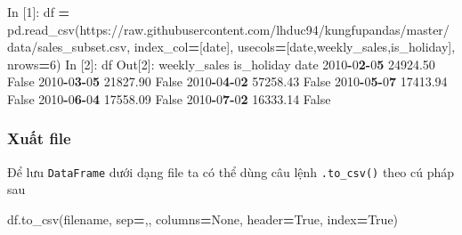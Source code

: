 \documentclass[
]{book}
\newenvironment{Shaded}{\begin{snugshade}}{\end{snugshade}}
\newcommand{\DecValTok}[1]{\textcolor[rgb]{0.00,0.00,0.81}{#1}}
\newcommand{\ErrorTok}[1]{\textcolor[rgb]{0.64,0.00,0.00}{\textbf{#1}}}
\newcommand{\FloatTok}[1]{\textcolor[rgb]{0.00,0.00,0.81}{#1}}
\newcommand{\NormalTok}[1]{#1}
\newcommand{\OperatorTok}[1]{\textcolor[rgb]{0.81,0.36,0.00}{\textbf{#1}}}
\newcommand{\StringTok}[1]{\textcolor[rgb]{0.31,0.60,0.02}{#1}}
\newcommand{\VariableTok}[1]{\textcolor[rgb]{0.00,0.00,0.00}{#1}}
\begin{document}
\begin{Shaded}
\begin{Highlighting}[]
\NormalTok{In [}\DecValTok{1}\NormalTok{]: df }\OperatorTok{=}\NormalTok{ pd.read\_csv(}\StringTok{\textquotesingle{}https://raw.githubusercontent.com/lhduc94/kungfupandas/master/data/sales\_subset.csv\textquotesingle{}}\NormalTok{, index\_col}\OperatorTok{=}\NormalTok{[}\StringTok{\textquotesingle{}date\textquotesingle{}}\NormalTok{], usecols}\OperatorTok{=}\NormalTok{[}\StringTok{\textquotesingle{}date\textquotesingle{}}\NormalTok{,}\StringTok{\textquotesingle{}weekly\_sales\textquotesingle{}}\NormalTok{,}\StringTok{\textquotesingle{}is\_holiday\textquotesingle{}}\NormalTok{], nrows}\OperatorTok{=}\DecValTok{6}\NormalTok{)}
\NormalTok{In [}\DecValTok{2}\NormalTok{]: df}
\NormalTok{Out[}\DecValTok{2}\NormalTok{]:}
\NormalTok{            weekly\_sales  is\_holiday}
\NormalTok{date                                }
\DecValTok{2010}\OperatorTok{{-}}\DecValTok{0}\ErrorTok{2}\OperatorTok{{-}}\DecValTok{0}\ErrorTok{5}      \FloatTok{24924.50}       \VariableTok{False}
\DecValTok{2010}\OperatorTok{{-}}\DecValTok{0}\ErrorTok{3}\OperatorTok{{-}}\DecValTok{0}\ErrorTok{5}      \FloatTok{21827.90}       \VariableTok{False}
\DecValTok{2010}\OperatorTok{{-}}\DecValTok{0}\ErrorTok{4}\OperatorTok{{-}}\DecValTok{0}\ErrorTok{2}      \FloatTok{57258.43}       \VariableTok{False}
\DecValTok{2010}\OperatorTok{{-}}\DecValTok{0}\ErrorTok{5}\OperatorTok{{-}}\DecValTok{0}\ErrorTok{7}      \FloatTok{17413.94}       \VariableTok{False}
\DecValTok{2010}\OperatorTok{{-}}\DecValTok{0}\ErrorTok{6}\OperatorTok{{-}}\DecValTok{0}\ErrorTok{4}      \FloatTok{17558.09}       \VariableTok{False}
\DecValTok{2010}\OperatorTok{{-}}\DecValTok{0}\ErrorTok{7}\OperatorTok{{-}}\DecValTok{0}\ErrorTok{2}      \FloatTok{16333.14}       \VariableTok{False}
\end{Highlighting}
\end{Shaded}

\hypertarget{xuux1ea5t-file}{%
\subsubsection{Xuất file}\label{xuux1ea5t-file}}

Để lưu \texttt{DataFrame} dưới dạng file ta có thể dùng câu lệnh \texttt{.to\_csv()} theo cú pháp sau

\begin{Shaded}
\begin{Highlighting}[]
\NormalTok{df.to\_csv(filename, sep}\OperatorTok{=}\StringTok{\textquotesingle{},\textquotesingle{}}\NormalTok{, columns}\OperatorTok{=}\VariableTok{None}\NormalTok{, header}\OperatorTok{=}\VariableTok{True}\NormalTok{, index}\OperatorTok{=}\VariableTok{True}\NormalTok{)}
\end{Highlighting}
\end{Shaded}
\end{document}
